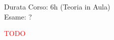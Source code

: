 \documentclass[../uefaC.tex]{subfiles}
\begin{document}
\onlyinsubfile{\maketitle}

\onlyinsubfile{}

\onlyinsubfile{\tableofcontents}


Durata Corso: 6h (Teoria in Aula) \hfill \\
Esame: ?

\textcolor{red}{TODO}
\end{document}
